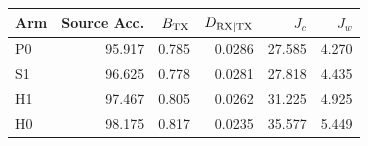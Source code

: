 \begin{tabular}{lrrrrr}
\toprule Arm & Source Acc. & $B_{\rm TX}$ & $D_{\rm RX|TX}$ & $J_c$ & $J_w$\\ \midrule
P0 & 95.917 & 0.785 & 0.0286 & 27.585 & 4.270 \\
S1 & 96.625 & 0.778 & 0.0281 & 27.818 & 4.435 \\
H1 & 97.467 & 0.805 & 0.0262 & 31.225 & 4.925 \\
H0 & 98.175 & 0.817 & 0.0235 & 35.577 & 5.449 \\
\bottomrule\end{tabular}
